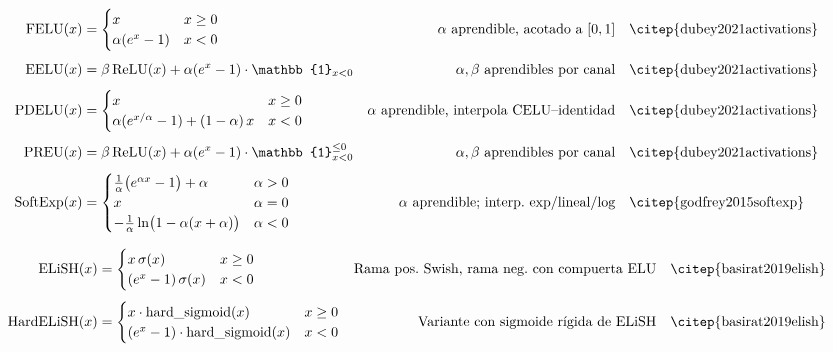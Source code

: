 {\footnotesize
\begin{align}
  \text{FELU}(x) &= \begin{cases} x & x\ge 0 \\ \alpha(e^{x}-1) & x<0 \end{cases}
    & \alpha\text{ aprendible, acotado a } [0,1]
    & \quad \text{\citep{dubey2021activations}} \\[4pt]
  \text{EELU}(x) &= \beta\,\text{ReLU}(x)+\alpha(e^{x}-1)\cdot\mathbb{1}_{x<0}
    & \alpha,\beta\text{ aprendibles por canal}
    & \quad \text{\citep{dubey2021activations}} \\[4pt]
  \text{PDELU}(x) &= \begin{cases} x & x\ge 0 \\
    \alpha(e^{x/\alpha}-1)+(1-\alpha)\,x & x<0 \end{cases}
    & \alpha\text{ aprendible, interpola CELU--identidad}
    & \quad \text{\citep{dubey2021activations}} \\[4pt]
  \text{PREU}(x) &= \beta\,\text{ReLU}(x)+\alpha(e^{x}-1)\cdot\mathbb{1}_{x<0}^{\le 0}
    & \alpha,\beta\text{ aprendibles por canal}
    & \quad \text{\citep{dubey2021activations}} \\[4pt]
  \text{SoftExp}(x) &= \begin{cases}
    \tfrac{1}{\alpha}\big(e^{\alpha x}-1\big)+\alpha & \alpha>0 \\
    x & \alpha=0 \\
    -\tfrac{1}{\alpha}\ln\!\big(1-\alpha(x+\alpha)\big) & \alpha<0
    \end{cases}
    & \alpha\text{ aprendible; interp.\ exp/lineal/log}
    & \quad \text{\citep{godfrey2015softexp}}
\end{align}
}  %

{\footnotesize
\begin{align}
  \text{ELiSH}(x) &= \begin{cases} x\,\sigma(x) & x\ge 0 \\
    (e^{x}-1)\,\sigma(x) & x<0 \end{cases}
    & \text{Rama pos.\ Swish, rama neg.\ con compuerta ELU}
    & \quad \text{\citep{basirat2019elish}} \\[4pt]
  \text{HardELiSH}(x) &= \begin{cases} x\cdot\text{hard\_sigmoid}(x) & x\ge 0 \\
    (e^{x}-1)\cdot\text{hard\_sigmoid}(x) & x<0 \end{cases}
    & \text{Variante con sigmoide rígida de ELiSH}
    & \quad \text{\citep{basirat2019elish}}
\end{align}
}  %

